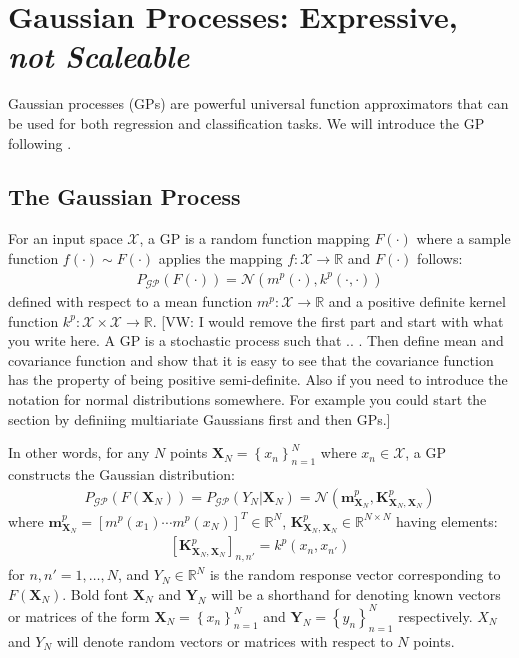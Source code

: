 \documentclass{article}
\newcommand{\vw}[1]{{\color{green} [VW: #1]}}
\newcommand{\GP}{\operatorname{\mathcal{GP}}}
\numberwithin{equation}{section}
\begin{document}
\section{Gaussian Processes: Expressive, \textit{not Scaleable}}
Gaussian processes (GPs) are powerful universal function approximators that can be used for both regression and classification tasks. We will introduce the GP following \cite{rasmussen2003gaussian}.

\subsection{The Gaussian Process}\label{section:the-gp}
For an input space $\mathcal{X}$, a GP is a random function mapping $F(\cdot)$ where a sample function $f(\cdot) \sim F(\cdot)$ applies the mapping $f: \mathcal{X} \rightarrow \mathbb{R}$ and $F(\cdot)$ follows:
\begin{align}
    P_{\GP}\left(F\left(\cdot \right)\right) =  \mathcal{N}(m^p(\cdot), k^p(\cdot, \cdot))
    \label{gp-normal}
\end{align}
defined with respect to a mean function $m^p: \mathcal{X} \rightarrow \mathbb{R}$ and a positive definite kernel function $k^p: \mathcal{X} \times \mathcal{X} \rightarrow \mathbb{R}$. \vw{I would remove the first part and start with what you write here. A GP is a stochastic process such that .. . Then define mean and covariance function and show that it is easy to see that the covariance function has the property of being positive semi-definite. Also if you need to introduce the notation for normal distributions somewhere. For example you could start the section by definiing multiariate Gaussians first and then GPs.}


In other words, for any $N$ points $\mathbf{X}_N = \left\{ x_n\right\}_{n=1}^N$ where $x_n \in \mathcal{X}$, a GP constructs the Gaussian distribution:
\begin{align}
    \label{gp-vector}
    P_{\GP}\left(F\left(\mathbf{X}_N\right)\right) = P_{\GP}\left(Y_N \vert \mathbf{X}_N\right) = \mathcal{N}\left(\mathbf{m}^p_{\mathbf{X}_N}, \mathbf{K}^{p}_{\mathbf{X}_N, \mathbf{X}_N}\right)
\end{align}
where $\mathbf{m}^p_{\mathbf{X}_N} = \left[ m^p(x_1) \cdots m^p(x_N)\right]^T \in \mathbb{R}^N$, $\mathbf{K}^p_{\mathbf{X}_N, \mathbf{X}_N} \in \mathbb{R}^{N \times N}$ having elements:
\begin{align}
    \left[\mathbf{K}^p_{\mathbf{X}_N, \mathbf{X}_N}\right]_{n, n'} = k^p(x_n, x_{n'})
\end{align}
for $n, n'=1,\dots, N$, and $Y_N \in \mathbb{R}^{N}$ is the random response vector corresponding to $F(\mathbf{X}_N)$. Bold font $\mathbf{X}_N$ and $\mathbf{Y}_N$ will be a shorthand for denoting known vectors or matrices of the form $\mathbf{X}_N = \left\{ x_n\right\}_{n=1}^N$ and $\mathbf{Y}_N = \left\{ y_n\right\}_{n=1}^N$ respectively. $X_N$ and $Y_N$ will denote random vectors or matrices with respect to $N$ points.
\end{document}
